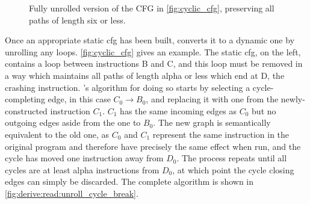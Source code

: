 \begin{wrapfigure}{o}{3.9cm}
\vspace{-16pt}
\begin{figgure}
\vspace{-2pt}
\caption{Fully unrolled version of the CFG in
  \autoref{fig:cyclic_cfg}, preserving all paths of length six or
  less.}
\label{fig:unrolled_cyclic_cfg}
\vspace{-4pt}
\end{figgure}
\vspace{-8pt}
\end{wrapfigure}
Once an appropriate \gls{static cfg} has been built, {\technique}
converts it to a dynamic one by unrolling any loops.
\autoref{fig:cyclic_cfg} gives an example.  The \gls{static cfg}, on
the left, contains a loop between instructions B and C, and this loop
must be removed in a way which maintains all paths of length
\gls{alpha} or less which end at D, the \gls{crashing instruction}.
    {\Technique}'s algorithm for doing so starts by selecting a
    cycle-completing edge, in this case $C_0{\rightarrow}B_0$, and
    replacing it with one from the newly-constructed instruction
    $C_1$.  $C_1$ has the same incoming edges as $C_0$ but no outgoing
    edges aside from the one to $B_0$.  The new graph is semantically
    equivalent to the old one, as $C_0$ and $C_1$ represent the same
    instruction in the original program and therefore have precisely
    the same effect when run, and the cycle has moved one instruction
    away from $D_0$.  The process repeats until all cycles are at
    least \gls{alpha} instructions from $D_0$, at which point the
    cycle closing edges can simply be discarded.  The complete
    algorithm is shown in
    \autoref{fig:derive:read:unroll_cycle_break}.

